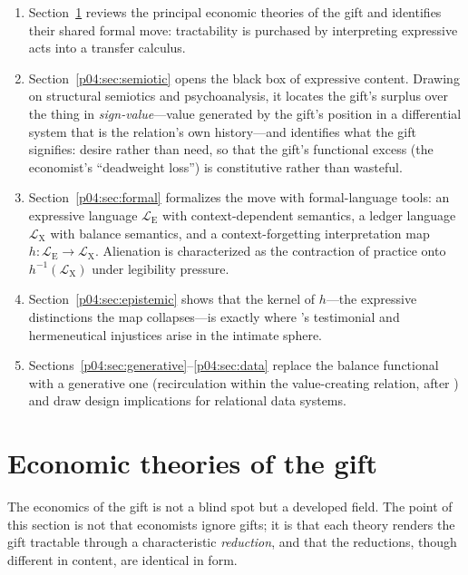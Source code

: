\documentclass[11pt,a4paper]{article}
\newcommand{\LE}{\mathcal{L}_{\mathrm{E}}}
\newcommand{\LX}{\mathcal{L}_{\mathrm{X}}}
\begin{document}
\begin{enumerate}[label=(\roman*)]
  \item Section~\ref{p04:sec:econ} reviews the principal economic theories of the
  gift and identifies their shared formal move: tractability is purchased by
  interpreting expressive acts into a transfer calculus.
  \item Section~\ref{p04:sec:semiotic} opens the black box of expressive content.
  Drawing on structural semiotics and psychoanalysis, it locates the gift's
  surplus over the thing in \emph{sign-value}---value generated by the gift's
  position in a differential system that is the relation's own history---and
  identifies what the gift signifies: desire rather than need, so that the
  gift's functional excess (the economist's ``deadweight loss'') is
  constitutive rather than wasteful.
  \item Section~\ref{p04:sec:formal} formalizes the move with formal-language
  tools: an expressive language $\LE$ with context-dependent semantics, a
  ledger language $\LX$ with balance semantics, and a context-forgetting
  interpretation map $h:\LE\to\LX$. Alienation is characterized as the
  contraction of practice onto $h^{-1}(\LX)$ under legibility pressure.
  \item Section~\ref{p04:sec:epistemic} shows that the kernel of $h$---the
  expressive distinctions the map collapses---is exactly where
  \textcite{fricker2007}'s testimonial and hermeneutical injustices arise in the
  intimate sphere.
  \item Sections~\ref{p04:sec:generative}--\ref{p04:sec:data} replace the balance
  functional with a generative one (recirculation within the value-creating
  relation, after \cite{eglash2016}) and draw design implications for
  relational data systems.
\end{enumerate}

\section{Economic theories of the gift}
\label{p04:sec:econ}

The economics of the gift is not a blind spot but a developed field. The
point of this section is not that economists ignore gifts; it is that each
theory renders the gift tractable through a characteristic \emph{reduction},
and that the reductions, though different in content, are identical in form.
\end{document}
